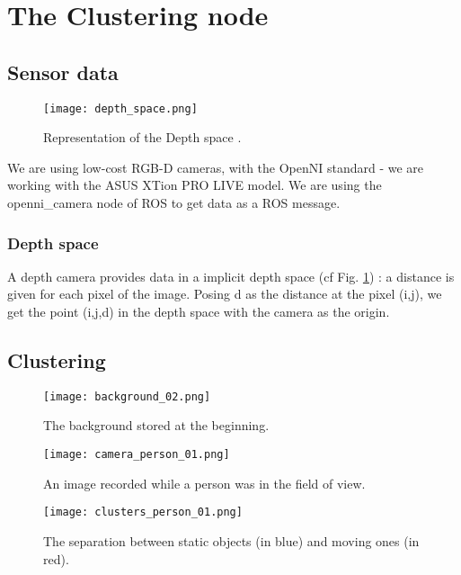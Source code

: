\documentclass[smallextended]{svjour3}
\begin{document}
\section{The Clustering node}

\subsection{Sensor data}

\begin{figure}
\centering
\texttt{[image: depth\_space.png]}
\caption{\label{fig:depth_space}Representation of the Depth space \cite{Ref1}.}
\end{figure}

We are using low-cost RGB-D cameras, with the OpenNI standard - we are working with the ASUS XTion PRO LIVE model. We are using the openni\_camera node of ROS \cite{Refopenni} to get data as a ROS message.

\subsubsection{Depth space}
A depth camera provides data in a implicit depth space (cf Fig. \ref{fig:depth_space}) : a distance is given for each pixel of the image. Posing d as the distance at the pixel (i,j), we get the point (i,j,d) in the depth space with the camera as the origin.

\subsection{Clustering}

\begin{figure}
\centering
\texttt{[image: background\_02.png]}
\caption{\label{fig:background2}The background stored at the beginning.}
\end{figure}

\begin{figure}
\centering
\texttt{[image: camera\_person\_01.png]}
\caption{\label{fig:cameraperson1}An image recorded while a person was in the field of view.}
\end{figure}

\begin{figure}
\centering
\texttt{[image: clusters\_person\_01.png]}
\caption{\label{fig:clustersperson1}The separation between static objects (in blue) and moving ones (in red).}
\end{figure}
\end{document}
